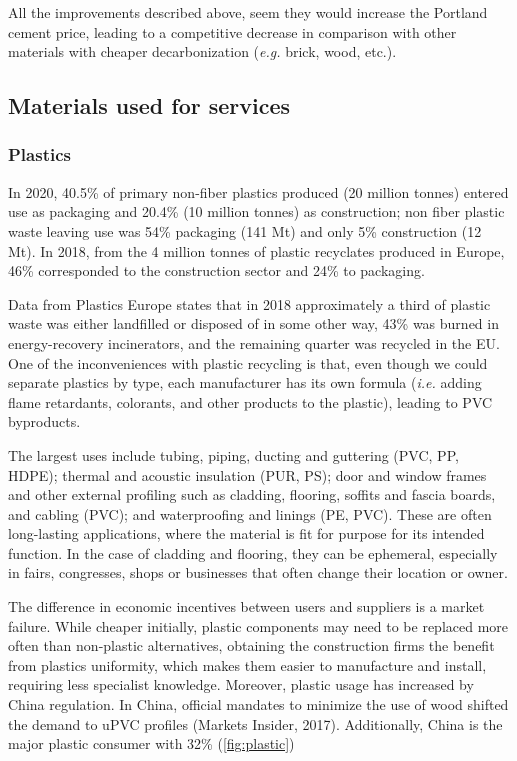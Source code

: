All the improvements described above, seem they would increase the Portland cement price, leading to a competitive decrease in comparison with other materials with cheaper decarbonization (\textit{e.g.} brick, wood, etc.).

\subsection{Materials used for services}
\label{sec:materials_used_for_services}

\subsubsection{Plastics}
\label{sec:plastics}

In 2020, 40.5\% of primary non-fiber plastics produced (20 million tonnes) entered use as packaging and 20.4\% (10 million tonnes) as construction;\autocite{plasticseurpo_2021} non fiber plastic waste leaving use was 54\% packaging (141 Mt) and only 5\% construction (12 Mt).\autocite{geyer2017production} In 2018, from the 4 million tonnes of plastic recyclates produced in Europe, 46\% corresponded to the construction sector and 24\% to packaging.\autocite{plasticseurpo_2021}

Data from Plastics Europe states that in 2018 approximately a third of plastic waste was either landfilled or disposed of in some other way, 43\% was burned in energy-recovery incinerators, and the remaining quarter was recycled in the EU.\autocite{asbp_2020} One of the inconveniences with plastic recycling is that, even though we could separate plastics by type, each manufacturer has its own formula (\textit{i.e.} adding flame retardants, colorants, and other products to the plastic), leading to PVC byproducts.\autocite{kommerling_2022}

The largest uses include tubing, piping, ducting and guttering (PVC, PP, HDPE); thermal and acoustic insulation (PUR, PS); door and window frames and other external profiling such as cladding, flooring, soffits and fascia boards, and cabling (PVC); and waterproofing and linings (PE, PVC). These are often long-lasting applications, where the material is fit for purpose for its intended function.\autocite{asbp_2020} In the case of cladding and flooring, they can be ephemeral, especially in fairs, congresses, shops or businesses that often change their location or owner.

The difference in economic incentives between users and suppliers is a market failure. While cheaper initially, plastic components may need to be replaced more often than non-plastic alternatives, obtaining the construction firms the benefit from plastics uniformity, which makes them easier to manufacture and install, requiring less specialist knowledge.\autocite{pickard2020phasing} Moreover, plastic usage has increased by China regulation. In China, official mandates to minimize the use of wood shifted the demand to uPVC profiles (Markets Insider, 2017). Additionally, China is the major plastic consumer with 32\% (\autoref{fig:plastic}) 

